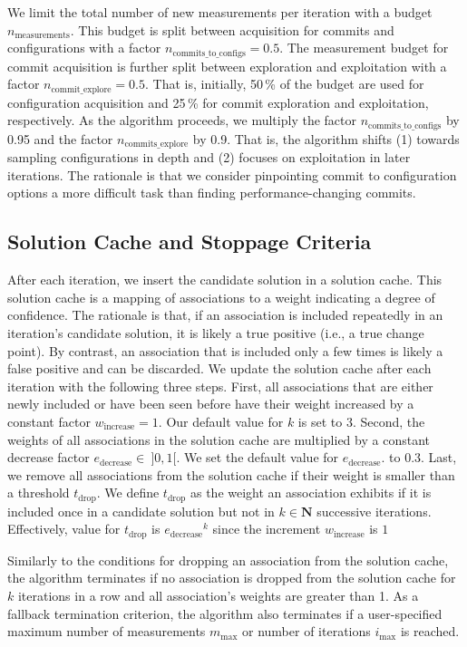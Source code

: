 \documentclass[sigconf]{acmart}
\begin{document}
	We limit the total number of new measurements per iteration with a budget $n_\text{measurements}$. This budget is split between acquisition for commits and configurations with a factor $n_\text{commits\_to\_configs} = 0.5$. The measurement budget for commit acquisition is further split between exploration and exploitation with a factor $n_\text{commit\_explore} = 0.5$. That is, initially, 50\,\% of the budget are used for configuration acquisition and 25\,\% for commit exploration and exploitation, respectively. As the algorithm proceeds, we multiply the factor $n_\text{commits\_to\_configs}$ by 0.95 and the factor $n_\text{commits\_explore}$ by 0.9. That is, the algorithm shifts  (1) towards sampling configurations in depth and (2) focuses on exploitation in later iterations. The rationale is that we consider pinpointing commit to configuration options a more difficult task than finding performance-changing commits.
	
	\subsection{Solution Cache and Stoppage Criteria}\label{sec:solutioncache}
	After each iteration, we insert the candidate solution in a solution cache. This solution cache is a mapping of associations to a weight indicating a degree of confidence. 
	The rationale is that, if an association is included repeatedly in an iteration's candidate solution, it is likely a true positive (i.e., a true change point). 
	By contrast, an association that is included only a few times is likely a false positive and can be discarded. 
	We update the solution cache after each iteration with the following three steps. 
	First, all associations that are either newly included or have been seen before have their weight increased by a constant factor $w_\text{increase} = 1$. Our default value for $k$ is set to 3.
	Second, the weights of all associations in the solution cache are multiplied by a constant decrease factor $e_\text{decrease}\in~\rbrack 0,1 \lbrack$. We set the default value for $e_\text{decrease}$. to 0.3.
	Last, we remove all associations from the solution cache if their weight is smaller than a threshold $t_\text{drop}$. We define $t_\text{drop}$ as the weight an association exhibits if it is included once in a candidate solution but not in $k \in \mathbf{N}$ successive iterations. Effectively, value for $t_\text{drop}$ is ${e_\text{decrease}}^k$ since the increment $w_\text{increase}$ is $1$
	
	Similarly to the conditions for dropping an association from the solution cache, the algorithm terminates if no association is dropped from the solution cache for $k$ iterations in a row and all association's weights are greater than 1. As a fallback termination criterion, the algorithm also terminates if a user-specified maximum number of measurements $m_\text{max}$ or number of iterations $i_\text{max}$ is reached. 
	
\end{document}
